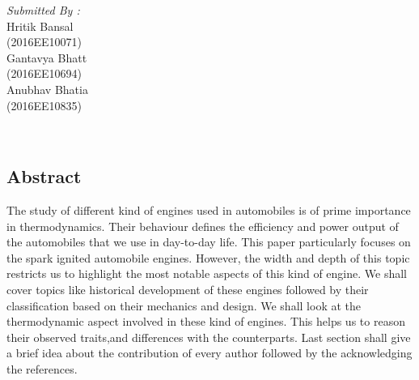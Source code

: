\documentclass[11pt]{article}
\begin{document}
\begin{titlepage}
\begin{minipage}{0.4\textwidth}
			\begin{flushright} \large
			\emph{Submitted By :} \\
			Hritik Bansal\\
			(2016EE10071)\\
			Gantavya Bhatt\\
			(2016EE10694)\\
			Anubhav Bhatia\\
			(2016EE10835)\\
		\end{flushright}
        
	\end{minipage}\\[2 cm]
	
\end{titlepage}


\tableofcontents
\pagebreak
% 
\begin{center}
    \section*{Abstract}
The study of different kind of engines used in automobiles is of prime importance in thermodynamics. Their behaviour defines the efficiency and power output of the automobiles that we use in day-to-day life. This paper particularly focuses on the spark ignited automobile engines. However, the width and depth of this topic restricts us to highlight the most notable aspects of this kind of engine. We shall cover topics like historical development of these engines followed by their classification based on their mechanics and design. We shall look at the thermodynamic aspect involved in these kind of engines. This helps us to reason their observed traits,and differences with the counterparts. Last section shall give a brief idea about the contribution of every author followed by the acknowledging the references.   


\end{center}
\end{document}
